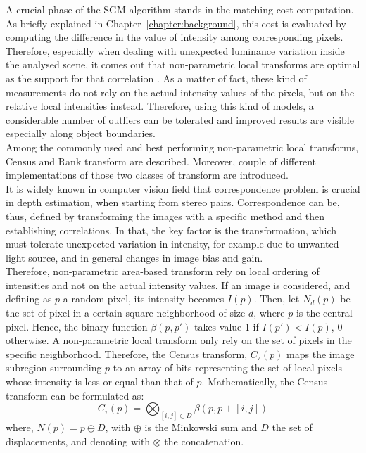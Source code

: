 A crucial phase of the SGM algorithm stands in the matching cost computation.
As briefly explained in Chapter~\ref{chapter:background}, this cost is evaluated by computing the difference in the value of intensity among corresponding pixels.
Therefore, especially when dealing with unexpected luminance variation inside the analysed scene, it comes out that non-parametric local transforms are optimal as the support for that correlation \cite{Zabih1994}.
As a matter of fact, these kind of measurements do not rely on the actual intensity values of the pixels, but on the relative local intensities instead.
Therefore, using this kind of models, a considerable number of outliers can be tolerated and improved results are visible especially along object boundaries.\\
Among the commonly used and best performing non-parametric local transforms, Census and Rank transform are described.
Moreover, couple of different implementations of those two classes of transform are introduced.\\
It is widely known in computer vision field that correspondence problem is crucial in depth estimation, when starting from stereo pairs.
Correspondence can be, thus, defined by transforming the images with a specific method and then establishing correlations.
In that, the key factor is the transformation, which must tolerate unexpected variation in intensity, for example due to unwanted light source, and in general changes in image bias and gain.\\
Therefore, non-parametric area-based transform rely on local ordering of intensities and not on the actual intensity values.
If an image is considered, and defining as $p$ a random pixel, its intensity becomes $I(p)$. 
Then, let $N_d(p)$ be the set of pixel in a certain square neighborhood of size $d$, where $p$ is the central pixel. 
Hence, the binary function $\beta(p, p')$ takes value 1 if $I(p') < I(p)$, 0 otherwise.
A non-parametric local transform only rely on the set of pixels in the specific neighborhood.
Therefore, the Census transform, $C_{\tau}(p)$ maps the image subregion surrounding $p$ to an array of bits representing the set of local pixels whose intensity is less or equal than that of $p$. 
Mathematically, the Census transform can be formulated as:
\begin{equation}
	\label{eqn:census-transform}
	C_{\tau}(p) = \bigotimes_{[i, j] \in D} \beta(p, p +[i, j])
\end{equation}
where, $N(p) = p \oplus D$, with $\oplus$ is the Minkowski sum and $D$ the set of displacements, and denoting with $\otimes$ the concatenation. 
